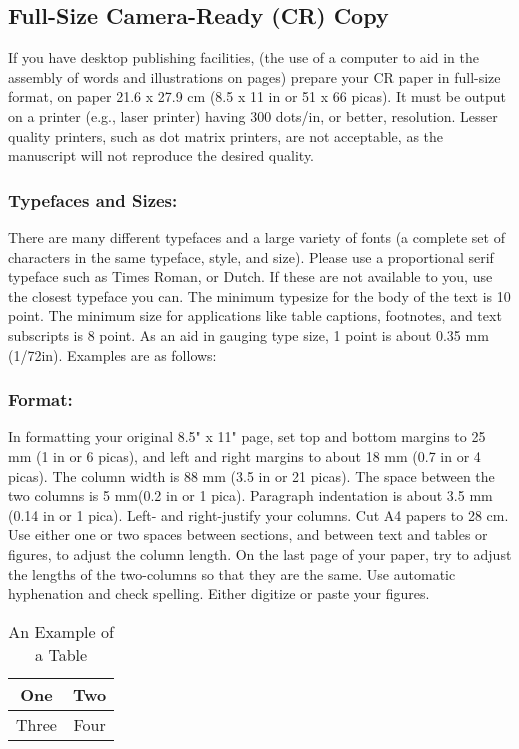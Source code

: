 \documentclass[letterpaper, 10 pt, conference]{ieeeconf}  %
\begin{document}
\subsection{Full-Size Camera-Ready (CR) Copy}

If you have desktop publishing facilities, (the use of a computer to aid
 in the assembly of words and illustrations on pages) prepare your CR paper
  in full-size format, on paper 21.6 x 27.9 cm (8.5 x 11 in or 51 x 66 picas).
  It must be output on a printer (e.g., laser printer) having 300 dots/in, or
  better, resolution. Lesser quality printers, such as dot matrix printers,
   are not acceptable, as the manuscript will not reproduce the desired quality.

\subsubsection{Typefaces and Sizes:} There are many different typefaces and a large
variety of fonts (a complete set of characters in the same typeface, style,
 and size). Please use a proportional serif typeface such as Times Roman,
 or Dutch. If these are not available to you, use the closest typeface you
  can. The minimum typesize for the body of the text is 10 point. The minimum
  size for applications like table captions, footnotes, and text subscripts
  is 8 point. As an aid in gauging type size, 1 point is about 0.35 mm (1/72in).
   Examples are as follows:

\subsubsection{Format:} In formatting your original 8.5" x 11" page, set top and
bottom margins to 25 mm (1 in or 6 picas), and left and right margins
to about 18 mm (0.7 in or 4 picas). The column width is 88 mm (3.5 in or 21 picas).
 The space between the two columns is 5 mm(0.2 in or 1 pica). Paragraph
 indentation is about 3.5 mm (0.14 in or 1 pica). Left- and right-justify your
 columns. Cut A4 papers to 28 cm. Use either one or two spaces between sections,
 and between text and tables or figures, to adjust the column length.
  On the last page of your paper, try to adjust the lengths of the
  two-columns so that they are the same. Use automatic hyphenation and
   check spelling. Either digitize or paste your figures.

\begin{table}
\caption{An Example of a Table}
\label{table_example}
\begin{center}
\begin{tabular}{|c||c|}
\hline
One & Two\\
\hline
Three & Four\\
\hline
\end{tabular}
\end{center}
\end{table}
\end{document}
